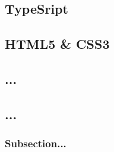 \subsection{TypeSript}

\subsection{HTML5 \& CSS3}

\subsection{...}

\subsection{...}

\subsubsection{Subsection...}
